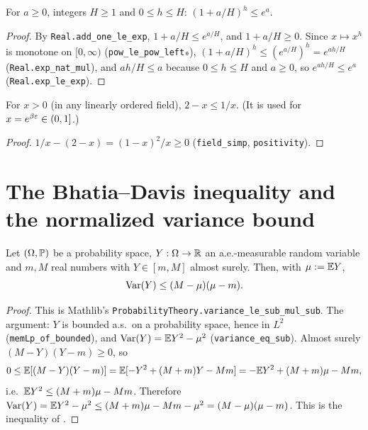 \begin{lemma}\label{lem:one_add_div_pow_le_exp}
\leanok
For $a \ge 0$, integers $H \ge 1$ and $0 \le h \le H$: $(1 + a/H)^h \le e^{a}$.
\end{lemma}

\begin{proof}
\leanok
By \texttt{Real.add\_one\_le\_exp}, $1 + a/H \le e^{a/H}$, and $1 + a/H \ge 0$. Since
$x \mapsto x^h$ is monotone on $[0, \infty)$ (\texttt{pow\_le\_pow\_left₀}),
$(1 + a/H)^h \le (e^{a/H})^h = e^{ah/H}$ (\texttt{Real.exp\_nat\_mul}), and $ah/H \le a$
because $0 \le h \le H$ and $a \ge 0$, so $e^{ah/H} \le e^{a}$ (\texttt{Real.exp\_le\_exp}).
\end{proof}

\begin{lemma}[{$2 - x \le 1/x$ on $(0, \infty)$}]\label{lem:two_sub_le_inv}
\leanok
For $x > 0$ (in any linearly ordered field), $2 - x \le 1/x$. (It is used for
$x = e^{\beta\varepsilon} \in (0, 1]$.)
\end{lemma}

\begin{proof}
\leanok
$1/x - (2 - x) = (1 - x)^2/x \ge 0$ (\texttt{field\_simp}, \texttt{positivity}).
\end{proof}

\section{The Bhatia--Davis inequality and the normalized variance bound}
\label{sec:pre_analysis_variance}

\begin{lemma}\label{lem:bhatia_davis}
\leanok
Let $(\Omega, \mathbb{P})$ be a probability space, $Y : \Omega \to \mathbb{R}$ an a.e.-measurable random
variable and $m, M$ real numbers with $Y \in [m, M]$ almost surely. Then, with $\mu := \mathbb{E} Y$,
\[
  \operatorname{Var}(Y) \le (M - \mu)(\mu - m) .
\]
\end{lemma}

\begin{proof}
\leanok
This is Mathlib's \texttt{ProbabilityTheory.variance\_le\_sub\_mul\_sub}. The argument:
$Y$ is bounded a.s.\ on a probability space, hence in $L^2$
(\texttt{memLp\_of\_bounded}), and $\operatorname{Var}(Y) = \mathbb{E} Y^2 - \mu^2$ (\texttt{variance\_eq\_sub}).
Almost surely $(M - Y)(Y - m) \ge 0$, so
\[
  0 \le \mathbb{E}[(M - Y)(Y - m)] = \mathbb{E}[-Y^2 + (M + m)Y - Mm] = -\mathbb{E} Y^2 + (M + m)\mu - Mm ,
\]
i.e.\ $\mathbb{E} Y^2 \le (M + m)\mu - Mm$. Therefore
$\operatorname{Var}(Y) = \mathbb{E} Y^2 - \mu^2 \le (M + m)\mu - Mm - \mu^2 = (M - \mu)(\mu - m)$.
This is the inequality of \cite{bhatia2000better}.
\end{proof}

